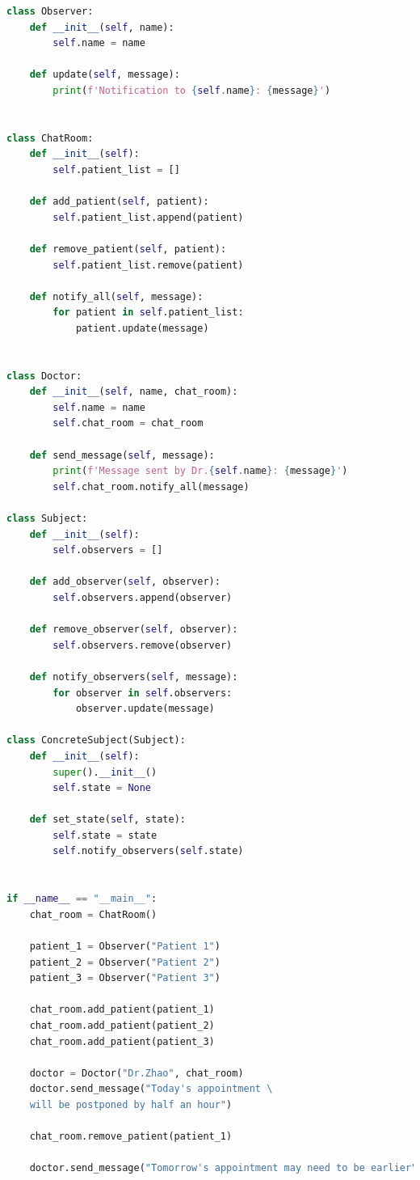 \documentclass[24pt,a4paper]{article}%
\begin{document}
\begin{lstlisting}[language=Python]
    class Observer:
    def __init__(self, name):
        self.name = name

    def update(self, message):
        print(f'Notification to {self.name}: {message}')


class ChatRoom:
    def __init__(self):
        self.patient_list = []

    def add_patient(self, patient):
        self.patient_list.append(patient)

    def remove_patient(self, patient):
        self.patient_list.remove(patient)

    def notify_all(self, message):
        for patient in self.patient_list:
            patient.update(message)


class Doctor:
    def __init__(self, name, chat_room):
        self.name = name
        self.chat_room = chat_room

    def send_message(self, message):
        print(f'Message sent by Dr.{self.name}: {message}')
        self.chat_room.notify_all(message)

class Subject:
    def __init__(self):
        self.observers = []

    def add_observer(self, observer):
        self.observers.append(observer)

    def remove_observer(self, observer):
        self.observers.remove(observer)

    def notify_observers(self, message):
        for observer in self.observers:
            observer.update(message)

class ConcreteSubject(Subject):
    def __init__(self):
        super().__init__()
        self.state = None

    def set_state(self, state):
        self.state = state
        self.notify_observers(self.state)


if __name__ == "__main__":
    chat_room = ChatRoom()
    
    patient_1 = Observer("Patient 1")
    patient_2 = Observer("Patient 2")
    patient_3 = Observer("Patient 3")
    
    chat_room.add_patient(patient_1)
    chat_room.add_patient(patient_2)
    chat_room.add_patient(patient_3)
    
    doctor = Doctor("Dr.Zhao", chat_room)
    doctor.send_message("Today's appointment \
    will be postponed by half an hour")

    chat_room.remove_patient(patient_1)
    
    doctor.send_message("Tomorrow's appointment may need to be earlier")
\end{lstlisting}
\end{document}
